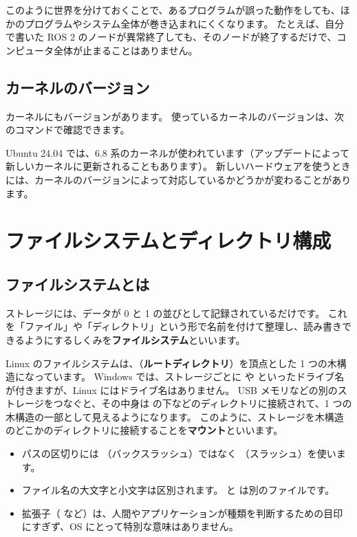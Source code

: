 このように世界を分けておくことで、あるプログラムが誤った動作をしても、ほかのプログラムやシステム全体が巻き込まれにくくなります。
たとえば、自分で書いた ROS 2 のノードが異常終了しても、そのノードが終了するだけで、コンピュータ全体が止まることはありません。

\subsection{カーネルのバージョン}

カーネルにもバージョンがあります。
使っているカーネルのバージョンは、次のコマンドで確認できます。


Ubuntu 24.04 では、6.8 系のカーネルが使われています（アップデートによって新しいカーネルに更新されることもあります）。
新しいハードウェアを使うときには、カーネルのバージョンによって対応しているかどうかが変わることがあります。

\section{ファイルシステムとディレクトリ構成}
\label{sec:linux-internals-fs}

\subsection{ファイルシステムとは}

ストレージには、データが 0 と 1 の並びとして記録されているだけです。
これを「ファイル」や「ディレクトリ」という形で名前を付けて整理し、読み書きできるようにするしくみを\textbf{ファイルシステム}といいます。

Linux のファイルシステムは、\cmd{/}（\textbf{ルートディレクトリ}）を頂点とした 1 つの木構造になっています。
Windows では、ストレージごとに  や  といったドライブ名が付きますが、Linux にはドライブ名はありません。
USB メモリなどの別のストレージをつなぐと、その中身は  の下などのディレクトリに接続されて、1 つの木構造の一部として見えるようになります。
このように、ストレージを木構造のどこかのディレクトリに接続することを\textbf{マウント}といいます。

\begin{point}
  \begin{itemize}
    \item パスの区切りには \cmd{\textbackslash}（バックスラッシュ）ではなく \cmd{/}（スラッシュ）を使います。
    \item ファイル名の大文字と小文字は区別されます。 と  は別のファイルです。
    \item 拡張子（ など）は、人間やアプリケーションが種類を判断するための目印にすぎず、OS にとって特別な意味はありません。
  \end{itemize}
\end{point}

